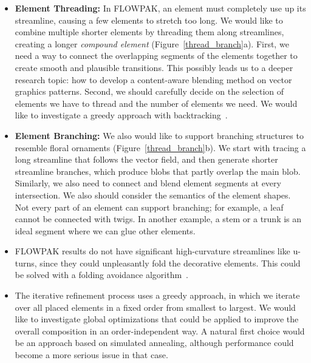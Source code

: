 \begin{itemize}

\item 
\newtext
{
\textbf{Element Threading:}
In FLOWPAK, an element must completely use up its streamline, 
causing a few elements to stretch too long.
We would like to combine multiple shorter elements
by threading them along streamlines, creating
a longer \textit{compound element} (Figure~\ref{thread_branch}a).
First, we need a way to connect the overlapping segments of the elements together
to create smooth and plausible transitions.
This possibly leads us to a deeper research topic:
how to develop a content-aware blending method on vector graphics patterns.
Second, we should carefully decide on the selection of elements we have to thread and
the number of elements we need. We would like to investigate a greedy approach
with backtracking~\cite{Kim2002}.
}

\item 
\newtext
{
\textbf{Element Branching:}
We also would like to support
branching structures to resemble floral ornaments (Figure~\ref{thread_branch}b).
We start with tracing a long streamline that follows the vector field,
and then generate shorter streamline branches,
which produce blobs that partly overlap the main blob.
Similarly, we also need to connect and blend element segments
at every intersection. 
We also should consider the semantics of the element shapes.
Not every part of an element can support branching; for example, a leaf
cannot be connected with twigs.
In another example, a stem or a trunk is an ideal segment where we can glue other elements.
}


\item {}
FLOWPAK results do not have significant high-curvature streamlines like u-turns, 
since they could unpleasantly fold the decorative elements. This could be solved with a folding avoidance algorithm~\cite{Asente2010}.

\item {}
The iterative refinement process uses a greedy approach, in which we 
iterate over all placed elements in a fixed order from smallest to largest.
We would like to investigate global optimizations
that could be applied to improve the overall composition in an 
order-independent way.  A natural first choice would be an approach based
on simulated annealing, although performance could become a more serious
issue in that case.


\end{itemize}
